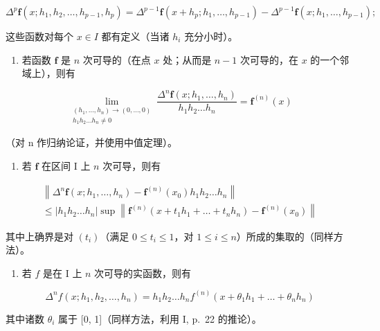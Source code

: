 \[
\Delta^ {p} \mathbf {f} (x; h _ {1}, h _ {2}, \dots , h _ {p - 1}, h _ {p}) = \Delta^ {p - 1} \mathbf {f} (x + h _ {p}; h _ {1}, \dots , h _ {p - 1}) - \Delta^ {p - 1} \mathbf {f} (x; h _ {1}, \dots , h _ {p - 1});
\]

这些函数对每个 \(x \in I\) 都有定义（当诸 \(h_{i}\) 充分小时）。

\begin{enumerate}
\def\labelenumi{\alph{enumi})}
\tightlist
\item
  若函数 \(\mathbf{f}\) 是 \(n\) 次可导的（在点 \(x\) 处；从而是 \(n - 1\) 次可导的，在 \(x\) 的一个邻域上），则有
\end{enumerate}

\[
\lim_{\substack{(h_{1},\ldots ,h_{n})\to (0,\ldots ,0)\\ h_{1}h_{2}\ldots h_{n}\neq 0}}\frac{\varDelta^{n}\mathbf{f}(x;h_{1},\ldots,h_{n})}{h_{1}h_{2}\ldots h_{n}} = \mathbf{f}^{(n)}(x)
\]

（对 n 作归纳论证，并使用中值定理）。

\begin{enumerate}
\def\labelenumi{\alph{enumi})}
\setcounter{enumi}{1}
\tightlist
\item
  若 \(\mathbf{f}\) 在区间 I 上 \(n\) 次可导，则有
\end{enumerate}

\[
\begin{array}{l} \left\| \Delta^ {n} \mathbf {f} (x; h _ {1}, \ldots , h _ {n}) - \mathbf {f} ^ {(n)} (x _ {0}) h _ {1} h _ {2} \ldots h _ {n} \right\| \\ \leqslant | h _ {1} h _ {2} \ldots h _ {n} | \sup \left\| \mathbf {f} ^ {(n)} (x + t _ {1} h _ {1} + \dots + t _ {n} h _ {n}) - \mathbf {f} ^ {(n)} (x _ {0}) \right\| \end{array}
\]

其中上确界是对 \((t_i)\)（满足 \(0 \leqslant t_i \leqslant 1\)，对 \(1 \leqslant i \leqslant n\)）所成的集取的（同样方法）。

\begin{enumerate}
\def\labelenumi{\alph{enumi})}
\setcounter{enumi}{2}
\tightlist
\item
  若 \(f\) 是在 I 上 \(n\) 次可导的实函数，则有
\end{enumerate}

\[
\Delta^ {n} f (x; h _ {1}, h _ {2}, \dots , h _ {n}) = h _ {1} h _ {2} \dots h _ {n} f ^ {(n)} (x + \theta_ {1} h _ {1} + \dots + \theta_ {n} h _ {n})
\]

其中诸数 \(\theta_{i}\) 属于 {[}0, 1{]}（同样方法，利用 I, p.~22 的推论）。

